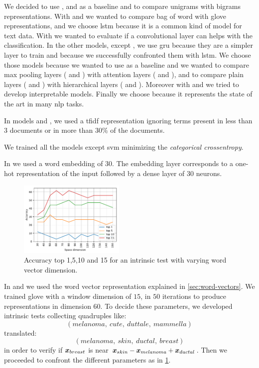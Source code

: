 We decided to use \svm{}, \svmb{} and \xgb{} as a baseline and to
compare unigrams with bigrams representations. With \lstmng{} and
\lstmb{} we wanted to compare bag of word with \ac{glove}
representations, and we choose \ac{lstm} because it is a common kind
of model for text data. With \lstmc{} we wanted to evaluate 
if a convolutional layer can helps with the classification. In the
other models, except \bert{}, we use \ac{gru} because they are a
simpler layer to train and 
because we successfully confronted them with \ac{lstm}. We choose
those models because we wanted to use \gru{} as a baseline and we
wanted to compare max pooling layers
(\maxp{} and \maxh{}) with attention layers (\softmax{} and \softmaxh{}),
and to compare plain layers (\maxp{} and \softmax{}) with hierarchical
layers (\maxh{} and \softmaxh{}). Moreover with
\maxi{} and \softmaxi{} we tried to develop interpretable
models. Finally we choose \bert{} because it represents the state of
the art in many \ac{nlp} tasks.

In models \svm{} and \svmb{}, we used a \ac{tfidf}
representation ignoring terms present in less
than 3 documents or in
more than 30\% of the documents. 

We trained all the models except \ac{svm} minimizing
the \emph{categorical crossentropy}.

In \lstmng{} we used a word embedding of $30$. The
embedding layer corresponds to a one-hot representation of the input
followed by a dense layer of $30$ neurons.

\begin{figure}
  \centering
  \includegraphics[width=0.45\textwidth]{img/gloveParameter.pdf}
  \caption{Accuracy top 1,5,10 and 15 for an intrinsic test with
    varying word vector dimension.}
  \label{fig:gloveParameter}
\end{figure}
In \lstmb{} and \lstmc{} we used the word vector representation
explained in \cref{sec:word-vectors}. We trained \ac{glove} with a window dimension of $15$,
in $50$ iterations to produce representations in dimension $60$. To
decide these parameters, we developed intrinsic tests collecting
quadruples like:
$$
(melanoma,\ cute,\ duttale,\ mammella)
$$
translated:
$$
(melanoma,\ skin,\ ductal,\ breast)
$$
in order to verify if $\bm{x}_{breast}$ is near
$\bm{x}_{skin}-\bm{x}_{melanoma}+\bm{x}_{ductal}$. Then we
proceeded to confront the different parameters as in
\cref{fig:gloveParameter}.

